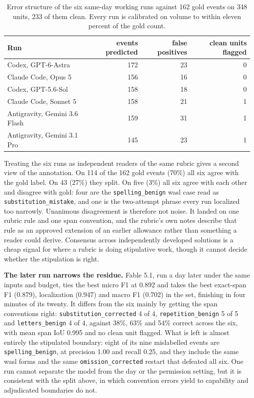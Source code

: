 \documentclass{article}
\begin{document}
\begin{table}[h]\centering\footnotesize\setlength{\tabcolsep}{5pt}
\begin{tabular}{lrrr}\toprule
Run & events predicted & false positives & clean units flagged\\\midrule
Codex, GPT-6-Astra & 172 & 23 & 0\\
Claude Code, Opus 5 & 156 & 16 & 0\\
Codex, GPT-5.6-Sol & 158 & 18 & 0\\
Claude Code, Sonnet 5 & 158 & 21 & 1\\
Antigravity, Gemini 3.6 Flash & 159 & 31 & 1\\
Antigravity, Gemini 3.1 Pro & 145 & 23 & 1\\
\bottomrule
\end{tabular}
\caption{Error structure of the six same-day working runs against 162 gold events on 348 units, 233 of them clean. Every run is calibrated on volume to within eleven percent of the gold count.}
\end{table}

Treating the six runs as independent readers of the same rubric gives a second view of the annotation. On 114 of the 162 gold events (70\%) all six agree with the gold label. On 43 (27\%) they split. On five (3\%) all six agree with each other and disagree with gold: four are the \texttt{spelling\_benign} wasl case read as \texttt{substitution\_mistake}, and one is the two-attempt phrase every run localized too narrowly. Unanimous disagreement is therefore not noise. It landed on one rubric rule and one span convention, and the rubric's own notes describe that rule as an approved extension of an earlier allowance rather than something a reader could derive. Consensus across independently developed solutions is a cheap signal for where a rubric is doing stipulative work, though it cannot decide whether the stipulation is right.

\textbf{The later run narrows the residue.} Fable 5.1, run a day later under the same inputs and budget, ties the best micro F1 at 0.892 and takes the best exact-span F1 (0.879), localization (0.947) and macro F1 (0.702) in the set, finishing in four minutes of its twenty. It differs from the six mainly by getting the span conventions right: \texttt{substitution\_corrected} 4 of 4, \texttt{repetition\_benign} 5 of 5 and \texttt{letters\_benign} 4 of 4, against 38\%, 63\% and 54\% correct across the six, with mean span IoU 0.995 and no clean unit flagged. What is left is almost entirely the stipulated boundary: eight of its nine mislabelled events are \texttt{spelling\_benign}, at precision 1.00 and recall 0.25, and they include the same wasl forms and the same \texttt{omission\_corrected} restart that defeated all six. One run cannot separate the model from the day or the permission setting, but it is consistent with the split above, in which convention errors yield to capability and adjudicated boundaries do not.
\end{document}
